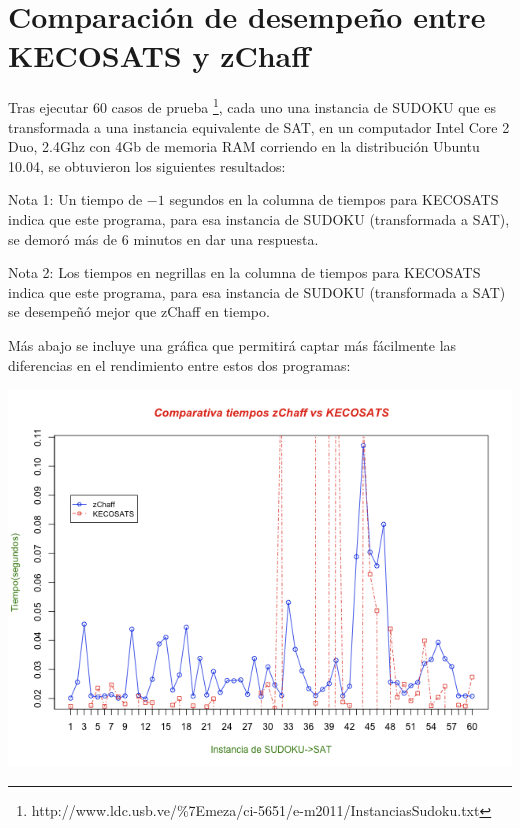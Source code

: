 \documentclass[12pt,lettersize,oneside]{article}
\begin{document}
\section{Comparación de desempeño entre KECOSATS y zChaff}

Tras ejecutar $60$ casos de prueba
\footnote{http://www.ldc.usb.ve/\%7Emeza/ci-5651/e-m2011/InstanciasSudoku.txt},
cada uno una instancia de SUDOKU que es transformada a una instancia equivalente
de SAT, en un computador Intel Core 2 Duo, 2.4Ghz con 4Gb de memoria RAM
corriendo en la distribución Ubuntu 10.04, se
obtuvieron los siguientes resultados:

Nota 1: Un tiempo de $-1$ segundos en la columna de tiempos para KECOSATS indica que
este programa, para esa instancia de SUDOKU (transformada a SAT), se demoró más
de $6$ minutos en dar una respuesta.

Nota 2: Los tiempos en negrillas en la columna de tiempos para KECOSATS indica
que este programa, para esa instancia de SUDOKU (transformada a SAT) se
desempeñó mejor que zChaff en tiempo.



Más abajo se incluye una gráfica que permitirá captar más fácilmente las
diferencias en el rendimiento entre estos dos programas:
\begin{center}
\includegraphics[scale=0.6]{compare.png}
\end{center}
\end{document}
